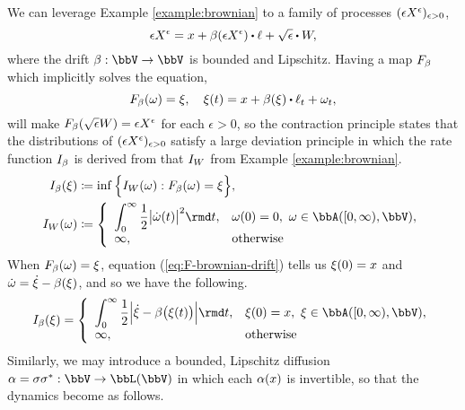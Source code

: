 \begin{example}[Diffusions]
  We can leverage Example \ref{example:brownian} to a family of processes $(\epsilon X^\epsilon)_{\epsilon>0}$,
  \begin{equation*}
    \Xe = \stateVar + \affDrift(\Xe) \shortInt \leb + \sqrt\epsilon \shortInt \W,
  \end{equation*}
  where the drift $\affDrift: \vecSpace \rightarrow \vecSpace$ is bounded and Lipschitz.
  Having a map $F_\beta$ which implicitly solves the equation,
  \begin{equation}
    \label{eq:F-brownian-drift}
    F_\affDrift(\omega) = \pathVar, \quad \pathVar(t) = \stateVar + \affDrift(\pathVar) \shortInt \leb_t + \omega_t,
  \end{equation}
  will make $F_\beta(\sqrt\epsilon W) = \epsilon X^\epsilon$ for each $\epsilon > 0$, so the contraction principle states that the distributions of $(\epsilon X^\epsilon)_{\epsilon>0}$ satisfy a large deviation principle in which the rate function $I_\beta$ is derived from that $I_W$ from Example \ref{example:brownian}.
  \begin{align*}
    \rf_\affDrift(\pathVar) &\defeq \inf\Big\{ \rf_\W(\omega) : F_\affDrift(\omega) = \pathVar \Big\},\\
    \rf_\W(\omega) &\defeq \left\{\begin{array}{ll}
      \displaystyle\int_0^\infty \frac12\big|\dot\omega(t)\big|^2 \rmd t, & \omega(0) = 0, ~ \omega \in \acpathSpace{[0,\infty)}{\vecSpace}, \\
      \infty, & \text{otherwise}
    \end{array}\right.
  \end{align*}
  When $F_\beta(\omega) = \xi$, equation (\ref{eq:F-brownian-drift}) tells us $\xi(0) = x$ and $\dot\omega = \dot{\xi} - \beta(\xi)$, and so we have the following.
  \begin{equation*}
    \rf_\affDrift(\pathVar) = \left\{\begin{array}{ll}
      \displaystyle \int_0^\infty \frac12 \Big|\dot\pathVar - \affDrift\big(\pathVar(t)\big)\Big| \rmd t, & \pathVar(0) = \stateVar, ~ \pathVar \in \acpathSpace{[0,\infty)}{\vecSpace}, \\
      \infty, & \text{otherwise}
    \end{array}\right.
  \end{equation*}
  Similarly, we may introduce a bounded, Lipschitz diffusion $\affDiff = \affDiffSqrt\affDiffSqrt^*: \vecSpace \rightarrow \bbL(\vecSpace)$ in which each $\alpha(x)$ is invertible, so that the dynamics become as follows.

\end{example}
